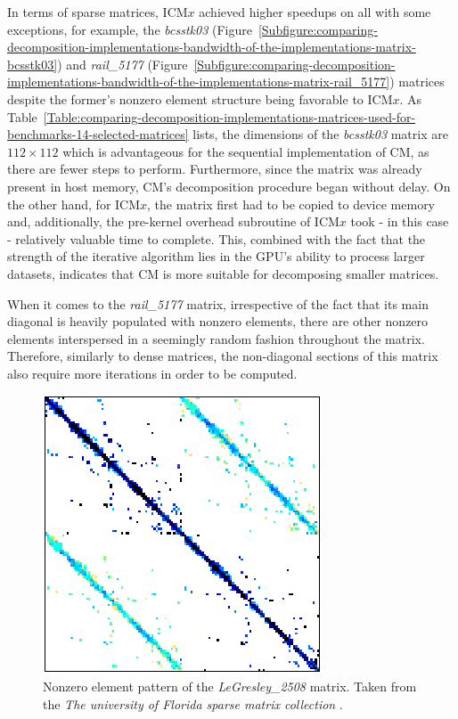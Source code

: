 In terms of sparse matrices, ICM$ x $ achieved higher speedups on all with some exceptions, for example, the \textit{bcsstk03} (Figure~\ref{Subfigure:comparing-decomposition-implementations-bandwidth-of-the-implementations-matrix-bcsstk03}) and \textit{rail\_5177} (Figure~\ref{Subfigure:comparing-decomposition-implementations-bandwidth-of-the-implementations-matrix-rail_5177}) matrices despite the former's nonzero element structure being favorable to ICM$ x $. As Table~\ref{Table:comparing-decomposition-implementations-matrices-used-for-benchmarks-14-selected-matrices} lists, the dimensions of the \textit{bcsstk03} matrix are $ 112\times 112 $ which is advantageous for the sequential implementation of CM, as there are fewer steps to perform. Furthermore, since the matrix was already present in host memory, CM's decomposition procedure began without delay. On the other hand, for ICM$ x $, the matrix first had to be copied to device memory and, additionally, the pre-kernel overhead subroutine of ICM$ x $ took - in this case - relatively valuable time to complete. This, combined with the fact that the strength of the iterative algorithm lies in the GPU's ability to process larger datasets, indicates that CM is more suitable for decomposing smaller matrices.

\par When it comes to the \textit{rail\_5177} matrix, irrespective of the fact that its main diagonal is heavily populated with nonzero elements, there are other nonzero elements interspersed in a seemingly random fashion throughout the matrix. Therefore, similarly to dense matrices, the non-diagonal sections of this matrix also require more iterations in order to be computed.

\begin{figure}
	\centering
	\includegraphics[width=.35\textwidth, keepaspectratio, clip]{images/ch3/matrices/legresley_2508.png}
	\caption{Nonzero element pattern of the \textit{LeGresley\_2508} matrix. Taken from the \emph{The university of Florida sparse matrix collection} \cite{Davis2011}.}
	\label{Figure:comparing-decomposition-implementations-bandwidth-of-the-implementations-matrix-legresley_2508}
\end{figure}

